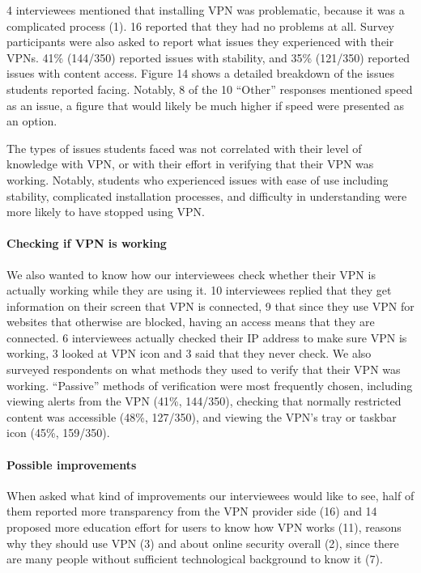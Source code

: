4 interviewees mentioned that installing VPN was problematic, because it was a
complicated process (1). 16 reported that they had no problems at all. Survey participants were also asked to report what issues they experienced with
their VPNs. 41\% (144/350) reported issues with stability, and 35\% (121/350)
reported issues with content access. Figure 14 shows a detailed breakdown of
the issues students reported facing. Notably, 8 of the 10 “Other” responses
mentioned speed as an issue, a figure that would likely be much higher if
speed were presented as an option.

The types of issues students faced was not correlated with their level of
knowledge with VPN, or with their effort in verifying that their VPN was
working. Notably, students who experienced issues with ease of use including
stability, complicated installation processes, and difficulty in understanding
were more likely to have stopped using VPN. 

\paragraph{Checking if VPN is working} We also wanted to know how our
interviewees check whether their VPN is actually working while they are using
it. 10 interviewees replied that they get information on their screen that VPN
is connected, 9 that since they use VPN for websites that otherwise are
blocked, having an access means that they are connected. 6 interviewees
actually checked their IP address to make sure VPN is working, 3 looked at VPN
icon and 3 said that they never check. 
We also surveyed respondents on what methods they used to verify that their
VPN was working. “Passive” methods of verification were most frequently
chosen, including viewing alerts from the VPN (41\%, 144/350), checking that
normally restricted content was accessible (48\%, 127/350), and viewing the
VPN’s tray or taskbar icon (45\%, 159/350).






\paragraph{Possible improvements} When asked what kind of improvements our
interviewees would like to see, half of them reported more transparency from
the VPN provider side (16) and 14 proposed more education effort for users to
know how VPN works (11), reasons why they should use VPN (3) and about online
security overall (2), since there are many people without sufficient
technological background to know it (7). 

